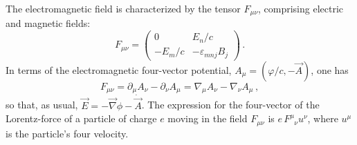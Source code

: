 \documentclass
[rmp,aps,twocolumn,showpacs,preprintnumbers,amsmath,amssymb]{revtex4}
\theoremstyle{plain}
\theoremstyle{definition}
\theoremstyle{remark}
\begin{document}
The electromagnetic field is characterized by the tensor
$F_{\mu\nu}$, comprising electric and magnetic fields: 
%
\begin{equation}\label{eq:EM-Components}
  F_{\mu\nu}=
  \begin{pmatrix}
    0      & E_n/c\\
    -E_m/c & -\varepsilon_{mnj}B_j
  \end{pmatrix}\,.
\end{equation}
%
In terms of the electromagnetic four-vector potential, 
$A_\mu=(\varphi/c,-\vec A)$, one has 
%
\begin{equation}\label{eq:FourPotential} 
  F_{\mu\nu}=\partial_\mu A_\nu-\partial_\nu A_\mu
            =\nabla_\mu A_\nu-\nabla_\nu A_\mu\,,
\end{equation}
%
so that, as usual, $\vec E=-\vec\nabla\phi-\dot{\vec A}$. 
The expression for the four-vector of the Lorentz-force of a particle 
of charge $e$ moving in the field $F_{\mu\nu}$ is 
$e\,F^\mu_{\phantom{\mu}\nu}u^\nu$, where $u^\mu$ is the 
particle's four velocity. 
\end{document}
